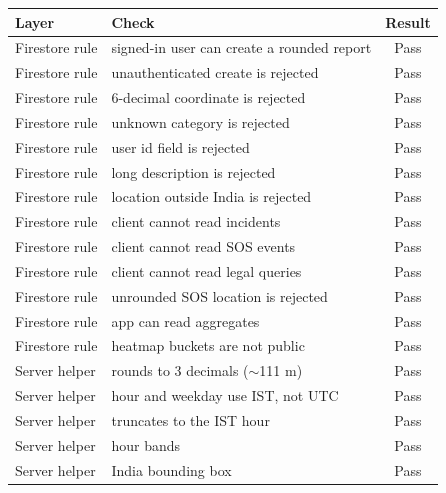 \begin{tabular}{llc}
\hline
Layer & Check & Result \\
\hline
Firestore rule & signed-in user can create a rounded report & Pass \\
Firestore rule & unauthenticated create is rejected & Pass \\
Firestore rule & 6-decimal coordinate is rejected & Pass \\
Firestore rule & unknown category is rejected & Pass \\
Firestore rule & user id field is rejected & Pass \\
Firestore rule & long description is rejected & Pass \\
Firestore rule & location outside India is rejected & Pass \\
Firestore rule & client cannot read incidents & Pass \\
Firestore rule & client cannot read SOS events & Pass \\
Firestore rule & client cannot read legal queries & Pass \\
Firestore rule & unrounded SOS location is rejected & Pass \\
Firestore rule & app can read aggregates & Pass \\
Firestore rule & heatmap buckets are not public & Pass \\
Server helper & rounds to 3 decimals ($\sim$111 m) & Pass \\
Server helper & hour and weekday use IST, not UTC & Pass \\
Server helper & truncates to the IST hour & Pass \\
Server helper & hour bands & Pass \\
Server helper & India bounding box & Pass \\
\hline
\end{tabular}
